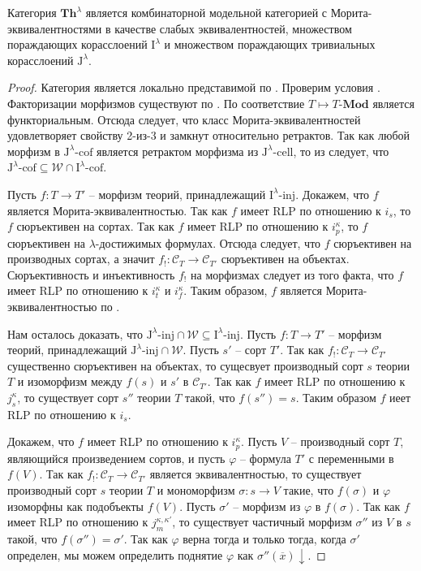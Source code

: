 \documentclass[reqno]{amsart}
\theoremstyle{definition}
\theoremstyle{remark}
\newcommand{\bcat}[1]{\mathbf{#1}}
\newcommand{\cat}[1]{\mathcal{#1}}
\newcommand{\we}{\mathcal{W}}
\newcommand{\Mod}[1]{#1\text{-}\bcat{Mod}}
\newcommand{\Th}{\bcat{Th}}
\newcommand{\I}{\mathrm{I}}
\newcommand{\J}{\mathrm{J}}
\newcommand{\class}[2]{#1\text{-}\mathrm{#2}}
\newcommand{\Iinj}[1][\I]{\class{#1}{inj}}
\newcommand{\Icell}[1][\I]{\class{#1}{cell}}
\newcommand{\Icof}[1][\I]{\class{#1}{cof}}
\begin{document}
\begin{thm}
Категория $\Th^\lambda$ является комбинаторной модельной категорией с Морита-эквивалентностями в качестве слабых эквивалентностей, множеством пораждающих корасслоений $\I^\lambda$ и множеством пораждающих тривиальных корасслоений $\J^\lambda$.
\end{thm}
\begin{proof}
Категория является локально представимой по .
Проверим условия .
Факторизации морфизмов существуют по .
По  соответствие $T \mapsto \Mod{T}$ является функториальным.
Отсюда следует, что класс Морита-эквивалентностей удовлетворяет свойству 2-из-3 и замкнут относительно ретрактов.
Так как любой морфизм в $\Icof[\J^\lambda]$ является ретрактом морфизма из $\Icell[\J^\lambda]$, то из  следует, что $\Icof[\J^\lambda] \subseteq \we \cap \Icof[\I^\lambda]$.

Пусть $f : T \to T'$ -- морфизм теорий, принадлежащий $\Iinj[\I^\lambda]$.
Докажем, что $f$ является Морита-эквивалентностью.
Так как $f$ имеет RLP по отношению к $i_s$, то $f$ сюръективен на сортах.
Так как $f$ имеет RLP по отношению к $i_p^\kappa$, то $f$ сюръективен на $\lambda$-достижимых формулах.
Отсюда следует, что $f$ сюръективен на производных сортах, а значит $f_! : \cat{C}_T \to \cat{C}_{T'}$ сюръективен на объектах.
Сюръективность и инъективность $f_!$ на морфизмах следует из того факта, что $f$ имеет RLP по отношению к $i_t^\kappa$ и $i_f^\kappa$.
Таким образом, $f$ является Морита-эквивалентностью по .

Нам осталось доказать, что $\Iinj[\J^\lambda] \cap \we \subseteq \Iinj[\I^\lambda]$.
Пусть $f : T \to T'$ -- морфизм теорий, принадлежащий $\Iinj[\J^\lambda] \cap \we$.
Пусть $s'$ -- сорт $T'$.
Так как $f_! : \cat{C}_T \to \cat{C}_{T'}$ существенно сюръективен на объектах, то сущесвует производный сорт $s$ теории $T$ и изоморфизм между $f(s)$ и $s'$ в $\cat{C}_{T'}$.
Так как $f$ имеет RLP по отношению к $j_s^\kappa$, то существует сорт $s''$ теории $T$ такой, что $f(s'') = s$.
Таким образом $f$ иеет RLP по отношению к $i_s$.

Докажем, что $f$ имеет RLP по отношению к $i^\kappa_p$.
Пусть $V$ -- производный сорт $T$, являющийся произведением сортов, и пусть $\varphi$ -- формула $T'$ с переменными в $f(V)$.
Так как $f_! : \cat{C}_T \to \cat{C}_{T'}$ является эквивалентностью, то существует производный сорт $s$ теории $T$ и мономорфизм $\sigma : s \to V$ такие, что $f(\sigma)$ и $\varphi$ изоморфны как подобъекты $f(V)$.
Пусть $\sigma'$ -- морфизм из $\varphi$ в $f(\sigma)$.
Так как $f$ имеет RLP по отношению к $j_m^{\kappa,\kappa'}$, то существует частичный морфизм $\sigma''$ из $V$ в $s$ такой, что $f(\sigma'') = \sigma'$.
Так как $\varphi$ верна тогда и только тогда, когда $\sigma'$ определен, мы можем определить поднятие $\varphi$ как $\sigma''(\overline{x})\!\downarrow$.


\end{proof}
\end{document}
